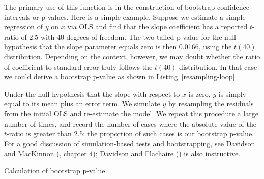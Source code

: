 The primary use of this function is in the construction of bootstrap
confidence intervals or p-values.  Here is a simple example.  Suppose
we estimate a simple regression of $y$ on $x$ via OLS and find that
the slope coefficient has a reported $t$-ratio of 2.5 with 40 degrees
of freedom.  The two-tailed p-value for the null hypothesis that the
slope parameter equals zero is then 0.0166, using the $t(40)$
distribution.  Depending on the context, however, we may doubt whether
the ratio of coefficient to standard error truly follows the $t(40)$
distribution.  In that case we could derive a bootstrap p-value as
shown in Listing~\ref{resampling-loop}.  

Under the null hypothesis that the slope with respect to $x$ is zero,
$y$ is simply equal to its mean plus an error term.  We simulate $y$
by resampling the residuals from the initial OLS and re-estimate the
model.  We repeat this procedure a large number of times, and record
the number of cases where the absolute value of the $t$-ratio is
greater than 2.5: the proportion of such cases is our bootstrap
p-value.  For a good discussion of simulation-based tests and
bootstrapping, see Davidson and MacKinnon
(\citeyear{davidson-mackinnon04}, chapter 4); Davidson and Flachaire
(\citeyear{davidson-flachaire01}) is also instructive.

\begin{script}[htbp]
  \caption{Calculation of bootstrap p-value}
  \label{resampling-loop}
\end{script}

    

